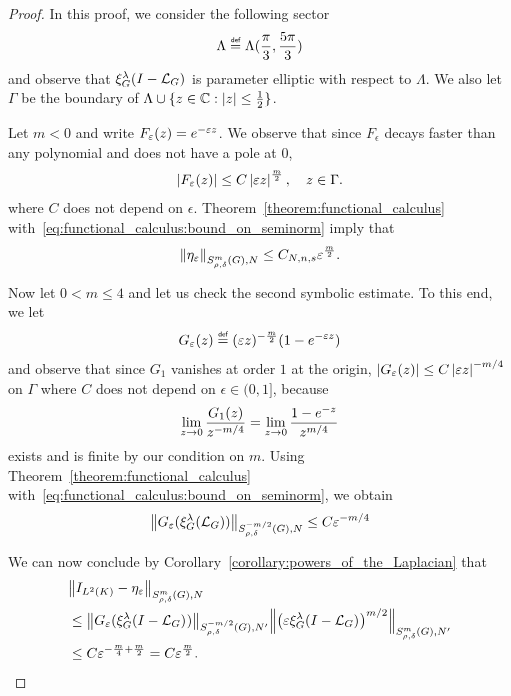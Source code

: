 \begin{proof}
    In this proof, we consider the following sector
    \begin{align*}
        \Lambda \defeq \Lambda(\frac {\pi} 3, \frac {5 \pi} 3)
    \end{align*}
    and observe that $\Rep \lambda \BesselPotentialSquared {}$ is parameter elliptic with respect to $\Lambda$.
    We also let $\Gamma$ be the boundary of $\Lambda \cup \{z \in \C : \abs z \leq \frac 1 2\}$.

    Let $m < 0$ and write $F_\epsilon(z) = {\e^{-\epsilon z}}$.
    We observe that since $F_\epsilon$ decays faster than any polynomial and does not have a pole at $0$,
    \begin{align*}
        \abs {F_\epsilon(z)} \leq C \abs {\epsilon z}^\frac m 2,
        \quad z \in \Gamma.
    \end{align*}
    where $C$ does not depend on $\epsilon$.
    Theorem~\ref{theorem:functional_calculus} with~\eqref{eq:functional_calculus:bound_on_seminorm} imply that
    \begin{align*}
        \SymbolSemiNorm {m} {\rho, \delta} N {\eta_\epsilon}
        \leq C_{N, n, s} \epsilon^{\frac m 2}.
    \end{align*}

    Now let $0 < m \leq 4$ and let us check the second symbolic estimate.
    To this end,
    we let
    \begin{align*}
        G_\epsilon(z) \defeq (\epsilon z)^{-\frac m 2} (1 - \e^{-\epsilon z})
    \end{align*}
    and observe that
    since $G_1$ vanishes at order $1$ at the origin,
    $\abs {G_\epsilon(z)} \leq C \abs {\epsilon z}^{-m/4}$ on $\Gamma$ where $C$ does not depend on $\epsilon \in (0, 1]$,
    because
    \begin{align*}
        \lim_{z \to 0} \frac {G_1(z)}{z^{-m / 4}}
        = \lim_{z \to 0} \frac {1 - \e^{-z}} {z^{m / 4}}
    \end{align*}
    exists and is finite by our condition on $m$.
    Using Theorem~\ref{theorem:functional_calculus} with~\eqref{eq:functional_calculus:bound_on_seminorm},
    we obtain
    \begin{align*}
        \SymbolSemiNorm {-m/2} {\rho, \delta} N {G_\epsilon(\Rep \lambda (\Laplacian))}
        \leq C \epsilon^{-m/4}
    \end{align*}

    We can now conclude by Corollary~\ref{corollary:powers_of_the_Laplacian} that
    \begin{align*}
        &\SymbolSemiNorm {m} {\rho, \delta } N {\Id {\Lebesgue 2 \CompactGroup} - \eta_\epsilon}\\
        &\leq
        \SymbolSemiNorm {-m/2} {\rho, \delta} {N'} {G_\epsilon(\Rep \lambda \BesselPotentialSquared {})}
        \SymbolSemiNorm {m} {\rho, \delta} {N'} {\left(\epsilon \Rep \lambda \BesselPotentialSquared {}\right)^{m/2}}\\
        &\leq C \epsilon^{-\frac m 4 + \frac m 2} = C \epsilon^\frac m 2.
    \end{align*}


\end{proof}

